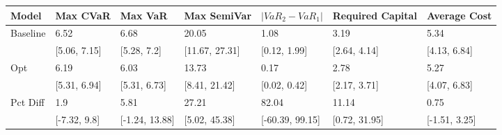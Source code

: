 \begin{tabular}{lllllll}
\toprule
   Model &     Max CVaR &        Max VaR &    Max SemiVar & $|VaR_2 - VaR_1|$ & Required Capital &  Average Cost \\
\midrule
Baseline &         6.52 &           6.68 &          20.05 &              1.08 &             3.19 &          5.34 \\
         & [5.06, 7.15] &    [5.28, 7.2] & [11.67, 27.31] &      [0.12, 1.99] &     [2.64, 4.14] &  [4.13, 6.84] \\
     Opt &         6.19 &           6.03 &          13.73 &              0.17 &             2.78 &          5.27 \\
         & [5.31, 6.94] &   [5.31, 6.73] &  [8.41, 21.42] &      [0.02, 0.42] &     [2.17, 3.71] &  [4.07, 6.83] \\
Pct Diff &          1.9 &           5.81 &          27.21 &             82.04 &            11.14 &          0.75 \\
         & [-7.32, 9.8] & [-1.24, 13.88] &  [5.02, 45.38] &   [-60.39, 99.15] &    [0.72, 31.95] & [-1.51, 3.25] \\
\bottomrule
\end{tabular}
